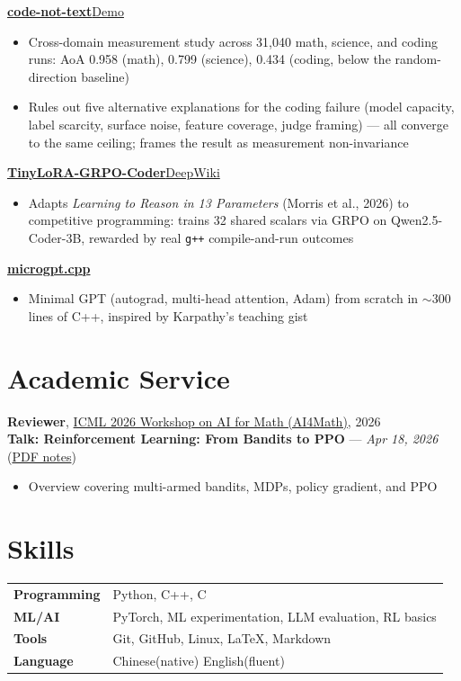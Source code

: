 \documentclass[10pt,letterpaper]{article}
\newcommand{\project}[2]{\textbf{#1}\hfill #2}
\begin{document}
\project{\href{https://github.com/chi-shan0707/code-not-text}{code-not-text}}{\href{https://chi-shan0707.github.io/code-not-text/demo}{Demo}}
\begin{itemize}
  \item Cross-domain measurement study across 31,040 math, science, and coding runs: AoA 0.958 (math), 0.799 (science), 0.434 (coding, below the random-direction baseline)
  \item Rules out five alternative explanations for the coding failure (model capacity, label scarcity, surface noise, feature coverage, judge framing) --- all converge to the same ceiling; frames the result as measurement non-invariance
\end{itemize}

\project{\href{https://github.com/Chi-Shan0707/TinyLoRA-GRPO-Coder}{TinyLoRA-GRPO-Coder}}{\href{https://deepwiki.com/Chi-Shan0707/TinyLoRA-GRPO-Coder}{DeepWiki}}
\begin{itemize}
  \item Adapts \emph{Learning to Reason in 13 Parameters} (Morris et al., 2026) to competitive programming: trains 32 shared scalars via GRPO on Qwen2.5-Coder-3B, rewarded by real \texttt{g++} compile-and-run outcomes
\end{itemize}

\project{\href{https://github.com/Chi-Shan0707/microgpt.cpp}{microgpt.cpp}}{}
\begin{itemize}
  \item Minimal GPT (autograd, multi-head attention, Adam) from scratch in $\sim$300 lines of C++, inspired by Karpathy's teaching gist
\end{itemize}

\section*{Academic Service}
\textbf{Reviewer}, \href{https://ai4math2026.github.io/}{ICML 2026 Workshop on AI for Math (AI4Math)}, 2026\\[3pt]
\textbf{Talk: Reinforcement Learning: From Bandits to PPO} --- \textit{Apr 18, 2026} (\href{https://chi-shan0707.github.io/files/From\%20Bandits\%20to\%20PPO.pdf}{PDF notes})
\begin{itemize}
  \item Overview covering multi-armed bandits, MDPs, policy gradient, and PPO
\end{itemize}

\section*{Skills}
\begin{tabularx}{\textwidth}{@{}>{\bfseries}p{}X@{}}
Programming & Python, C++, C \\
ML/AI & PyTorch, ML experimentation, LLM evaluation, RL basics \\
Tools & Git, GitHub, Linux, LaTeX, Markdown \\
Language & Chinese(native) English(fluent) \\
\end{tabularx}
\end{document}
